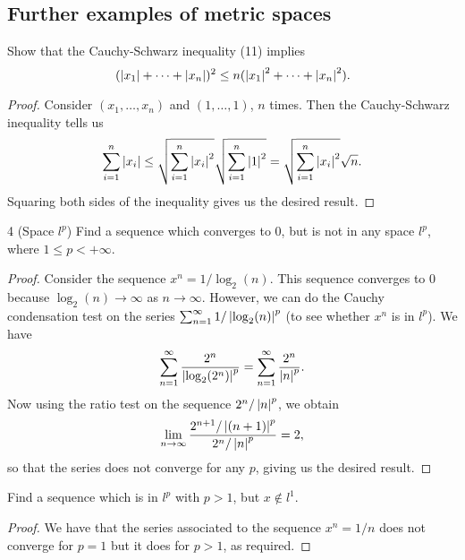 \subsection{Further examples of metric spaces}


\begin{exercise}{3}
Show that the Cauchy-Schwarz inequality (11) implies 
\[
(\left\lvert x_1\right\rvert+\dots+\left\lvert x_n\right\rvert)^2 
\leq n (\left\lvert x_1\right\rvert^2+\dots+\left\lvert x_n\right\rvert^2).
\]
\end{exercise}
\begin{proof}
Consider $(x_1,\dots,x_n)$ and $(1,\dots,1)$, $n$ times. Then the Cauchy-Schwarz inequality tells us
\[
\sum^n_{i=1}\left\lvert x_i\right\rvert \leq
\sqrt{\sum_{i=1}^n\left\lvert x_i\right\rvert^2}\sqrt{\sum_{i=1}^n\left\lvert 1\right\rvert^2} 
=\sqrt{\sum_{i=1}^n\left\lvert x_i\right\rvert^2}\sqrt{n}.
\]
Squaring both sides of the inequality gives us the desired result.
\end{proof}

\begin{exercise}{4 (Space $l^p$)}
Find a sequence which converges to 0, but is not in any space $l^p$, where $1\leq p<+\infty$.
\end{exercise}
\begin{proof}
Consider the sequence $x^n=1/\log_2(n)$. This sequence converges to 0 because $\log_2(n)\to\infty$ as $n\to\infty$. However, we can do the Cauchy condensation test on the series $\sum_{n=1}^\infty 1/\left\lvert \log_2(n)\right\rvert^p$ (to see whether $x^n$ is in $l^p$). We have 
\begin{align*}
    \sum_{n=1}^\infty \frac{2^n}{\left\lvert \log_2(2^n)\right\rvert^p} 
    =\sum_{n=1}^\infty \frac{2^n}{\left\lvert n\right\rvert^p}.
\end{align*}
Now using the ratio test on the sequence $2^n/\left\lvert n\right\rvert^p$, we obtain
\[
\lim_{n\to\infty}\frac{2^{n+1}/\left\lvert (n+1)\right\rvert^p}{2^n/\left\lvert n\right\rvert^p} =2,
\]
so that the series does not converge for any $p$, giving us the desired result.
\end{proof}

\begin{exercise}{5}
Find a sequence which is in $l^p$ with $p>1$, but $x\notin l^1$.
\end{exercise}
\begin{proof}
We have that the series associated to the sequence $x^n=1/n$ does not converge for $p=1$ but it does for $p>1$, as required.
\end{proof}

